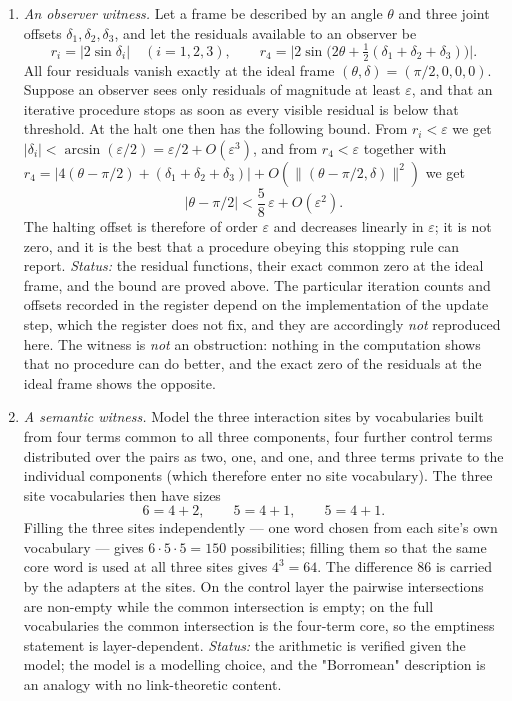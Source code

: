 \begin{enumerate}
  \item \emph{An observer witness.}  Let a frame be described by an angle
  $\theta$ and three joint offsets $\delta_1,\delta_2,\delta_3$, and let the
  residuals available to an observer be
  \[
    r_i=\bigl|2\sin\delta_i\bigr| \quad (i=1,2,3),
    \qquad
    r_4=\bigl|2\sin\bigl(2\theta+\tfrac12(\delta_1+\delta_2+\delta_3)\bigr)\bigr| .
  \]
  All four residuals vanish exactly at the ideal frame
  $(\theta,\delta)=(\pi/2,0,0,0)$.  Suppose an observer sees only residuals of
  magnitude at least $\varepsilon$, and that an iterative procedure stops as
  soon as every visible residual is below that threshold.  At the halt one then
  has the following bound.  From $r_i<\varepsilon$ we get
  $|\delta_i|<\arcsin(\varepsilon/2)=\varepsilon/2+O(\varepsilon^3)$, and from
  $r_4<\varepsilon$ together with
  $r_4=\bigl|4(\theta-\pi/2)+(\delta_1+\delta_2+\delta_3)\bigr|+O(\lVert(\theta-\pi/2,\delta)\rVert^2)$
  we get
  \[
    \bigl|\theta-\pi/2\bigr|
    <\frac58\,\varepsilon+O(\varepsilon^2).
  \]
  The halting offset is therefore of order $\varepsilon$ and decreases linearly
  in $\varepsilon$; it is not zero, and it is the best that a procedure obeying
  this stopping rule can report.  \emph{Status:} the residual functions, their
  exact common zero at the ideal frame, and the bound are proved above.  The
  particular iteration counts and offsets recorded in the register depend on the
  implementation of the update step, which the register does not fix, and they
  are accordingly \emph{not} reproduced here.  The witness is \emph{not} an
  obstruction: nothing in the computation shows that no procedure can do better,
  and the exact zero of the residuals at the ideal frame shows the opposite.

  \item \emph{A semantic witness.}  Model the three interaction sites by
  vocabularies built from four terms common to all three components, four
  further control terms distributed over the pairs as two, one, and one, and
  three terms private to the individual components (which therefore enter no
  site vocabulary).  The three site vocabularies then have sizes
  \[
    6=4+2,\qquad 5=4+1,\qquad 5=4+1 .
  \]
  Filling the three sites independently --- one word chosen from
  each site's own vocabulary --- gives $6\cdot5\cdot5=150$ possibilities;
  filling them so that the same core word is used at all three sites gives
  $4^3=64$.  The difference $86$ is carried by the adapters at the sites.  On
  the control layer the pairwise intersections are non-empty while the common
  intersection is empty; on the full vocabularies the common intersection is the
  four-term core, so the emptiness statement is layer-dependent.
  \emph{Status:} the arithmetic is verified given the model; the model is a
  modelling choice, and the "Borromean" description is an analogy with no
  link-theoretic content.


\end{enumerate}
